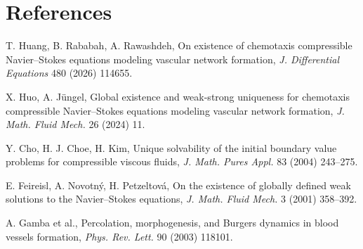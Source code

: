 \section*{References}

\begin{enumerate}[label={[\arabic*]}, leftmargin=*]
\item T. Huang, B. Rababah, A. Rawashdeh, On existence of chemotaxis compressible Navier--Stokes equations modeling vascular network formation, \emph{J. Differential Equations} 480 (2026) 114655.
\item X. Huo, A. Jüngel, Global existence and weak-strong uniqueness for chemotaxis compressible Navier--Stokes equations modeling vascular network formation, \emph{J. Math. Fluid Mech.} 26 (2024) 11.
\item Y. Cho, H. J. Choe, H. Kim, Unique solvability of the initial boundary value problems for compressible viscous fluids, \emph{J. Math. Pures Appl.} 83 (2004) 243--275.
\item E. Feireisl, A. Novotný, H. Petzeltová, On the existence of globally defined weak solutions to the Navier--Stokes equations, \emph{J. Math. Fluid Mech.} 3 (2001) 358--392.
\item A. Gamba et al., Percolation, morphogenesis, and Burgers dynamics in blood vessels formation, \emph{Phys. Rev. Lett.} 90 (2003) 118101.
\end{enumerate}
